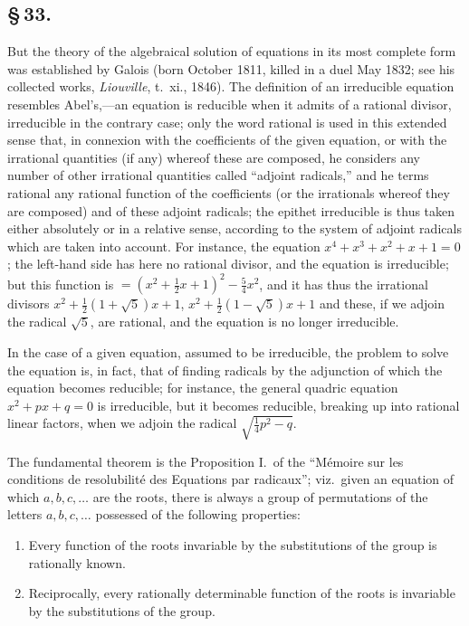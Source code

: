 \documentclass[11pt,a4paper]{article}
\begin{document}
\subsection*{\S\,33.}

But the theory of the algebraical solution of equations in its most complete form was established by Galois (born October 1811, killed in a duel May 1832; see his collected works, \textit{Liouville}, t.~xi., 1846). The definition of an irreducible equation resembles Abel's,---an equation is reducible when it admits of a rational divisor, irreducible in the contrary case; only the word rational is used in this extended sense that, in connexion with the coefficients of the given equation, or with the irrational quantities (if any) whereof these are composed, he considers any number of other irrational quantities called ``adjoint radicals,'' and he terms rational any rational function of the coefficients (or the irrationals whereof they are composed) and of these adjoint radicals; the epithet irreducible is thus taken either absolutely or in a relative sense, according to the system of adjoint radicals which are taken into account. For instance, the equation $x^{4} + x^{3} + x^{2} + x + 1 = 0$; the left-hand side has here no rational divisor, and the equation is irreducible; but this function is $= (x^{2} + \frac{1}{2}x + 1)^{2} - \frac{5}{4}x^{2}$, and it has thus the irrational divisors $x^{2} + \frac{1}{2}(1 + \sqrt{5})x + 1$, $x^{2} + \frac{1}{2}(1 - \sqrt{5})x + 1$ and these, if we adjoin the radical $\sqrt{5}$, are rational, and the equation is no longer irreducible.

In the case of a given equation, assumed to be irreducible, the problem to solve the equation is, in fact, that of finding radicals by the adjunction of which the equation becomes reducible; for instance, the general quadric equation $x^{2} + px + q = 0$ is irreducible, but it becomes reducible, breaking up into rational linear factors, when we adjoin the radical $\sqrt{\frac{1}{4}p^{2} - q}$.

The fundamental theorem is the Proposition I.\ of the ``M\'{e}moire sur les conditions de resolubilit\'{e} des Equations par radicaux''; viz.\ given an equation of which $a, b, c, \ldots$ are the roots, there is always a group of permutations of the letters $a, b, c, \ldots$ possessed of the following properties:
\begin{enumerate}
\item Every function of the roots invariable by the substitutions of the group is rationally known.
\item Reciprocally, every rationally determinable function of the roots is invariable by the substitutions of the group.
\end{enumerate}
\end{document}
